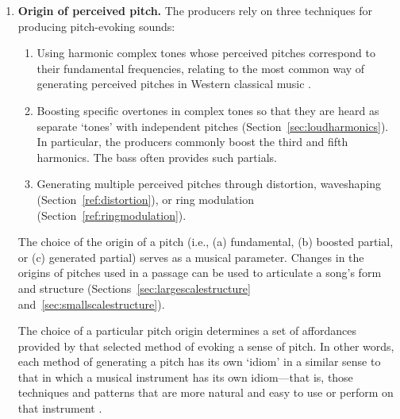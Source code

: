 \documentclass{article}
\newcommand{\emmanuel}[1]{ {\color{blue}[\noindent {\textbf{EMMANUEL:}~#1}]} }
\newcommand{\david}[1]{ {\color{red}[\noindent {\textbf{DAVID:}~#1}]} }
\begin{document}
\begin{enumerate}[label={(\arabic*)}]

    \item {\bfseries Origin of perceived pitch.} The producers rely on three techniques for producing pitch-evoking sounds:

    \begin{enumerate}[noitemsep, label={(\alph*)}]
    
      \item Using harmonic complex tones whose perceived pitches correspond to their fundamental frequencies, relating to the most common way of generating perceived pitches in Western classical music \citep{rameau1750demonstration}. 
            
      \item  
      Boosting specific overtones in complex tones so that they are heard as
      separate `tones' with independent pitches (Section~\ref{sec:loudharmonics}). In particular, the producers commonly boost the third and fifth harmonics.
      The bass often provides such partials.
      
      \item 
      Generating multiple perceived pitches
through distortion, waveshaping (Section~\ref{ref:distortion}), or ring modulation (Section~\ref{ref:ringmodulation}).
      
    \end{enumerate}


    
The choice of the origin of a pitch (i.e., (a) fundamental, (b) boosted partial, or (c) generated partial) serves as a musical parameter. Changes in the origins of pitches used in a passage can be used to articulate a song's form and structure (Sections~\ref{sec:largescalestructure} and~\ref{sec:smallscalestructure}).
    
The choice of a particular pitch origin determines a set of affordances provided by that selected method of evoking a sense of pitch. In other words, each method of generating a pitch has its own `idiom' in a similar sense to that in which a musical instrument has its own idiom---that is, those techniques and patterns that are more natural and easy to use or perform on that instrument \citep[p.~103]{huron2009characterizing}.


\end{enumerate}
\end{document}
